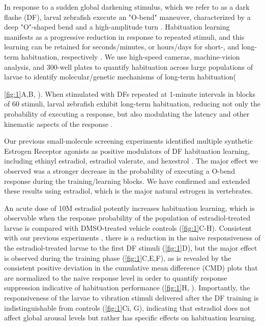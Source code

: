 \documentclass[10pt,lineno]{RandlettLab_elife}
\begin{document}
\begin{figure}
\begin{fullwidth}
\begin{center}
\label{fig:1}

\end{center}
\end{fullwidth}
\end{figure}

In response to a sudden global darkening stimulus, which we refer to as a dark flashe (DF), larval zebrafish execute an "O-bend" maneuver, characterized by a deep "O"-shaped bend and a high-amplitude turn \citep{Burgess2007}. 
Habituation learning manifests as a progressive reduction in response to repeated stimuli, and this learning can be retained for seconds/minutes, or hours/days for short-, and long-term habituation, respectively \citep{Rankin2009-no}. 
We use high-speed cameras, machine-vision analysis, and 300-well plates to quantify habituation across large populations of larvae to identify molecular/genetic mechanisms of long-term habituation({\autoref{fig:1}A,B, \citealp{Randlett2019-fj,Lamire2023-he}). 
When stimulated with DFs repeated at 1-minute intervals in blocks of 60 stimuli, larval zebrafish exhibit long-term habituation, reducing not only the probability of executing a response, but also modulating the latency and other kinematic aspects of the response \citep{Randlett2019-fj}.  


Our previous small-molecule screening experiments identified multiple synthetic Estrogen Receptor agonists as positive modulators of DF habituation learning, including ethinyl estradiol, estradiol valerate, and hexestrol  \citep{Lamire2023-he}. 
The major effect we observed was a stronger decrease in the probability of executing a O-bend response during the training/learning blocks. 
We have confirmed and extended these results using estradiol, which is the major natural estrogen in vertebrates. 

An acute dose of 10\textmu M estradiol potently increases habituation learning, which is observable when the response probability of the population of estradiol-treated larvae is compared with DMSO-treated vehicle controls (\autoref{fig:1}C-H).
Consistent with our previous experiments \citep{Lamire2023-he}, there is a reduction in the naive responsiveness of the estradiol-treated larvae to the first DF stimuli (\autoref{fig:1}D), but the major effect is observed during the training phase (\autoref{fig:1}C,E,F), as is revealed by the consistent positive deviation in the cumulative mean difference (CMD) plots that are normalized to the naive response level in order to quantify response suppression indicative of habituation performance (\autoref{fig:1}H, \citealp{Randlett2019-fj}).
Importantly, the responsiveness of the larvae to vibration stimuli delivered after the DF training is indistinguishable from controls (\autoref{fig:1}Ci, G), indicating that estradiol does not affect global arousal levels but rather has specific effects on habituation learning. 

}
\end{document}
